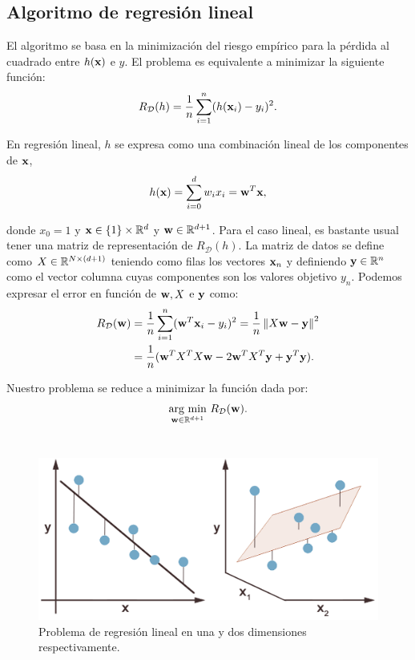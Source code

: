 \documentclass[oneside,openright,titlepage,numbers=noenddot,openany,headinclude,footinclude=true,
cleardoublepage=empty,abstractoff,BCOR=5mm,paper=a4,fontsize=12pt,main=spanish]{scrreprt}
\begin{document}
\subsection*{Algoritmo de regresión lineal}

El algoritmo se basa en la minimización del riesgo empírico para la pérdida al cuadrado entre $h(\textbf{x})$ e $y$. El problema es equivalente a minimizar la siguiente función:
\begin{equation*}
    R_{\mathcal{D}}(h) = \frac{1}{n} \sum_{i=1}^n (h(\textbf{x}_i)-y_i)^2.
\end{equation*}

En regresión lineal, $h$ se expresa como una combinación lineal de los componentes de $\textbf{x}$,
\begin{equation*}
    h(\textbf{x})=\sum_{i=0}^d w_i x_i = \textbf{w}^T \textbf{x},
\end{equation*}

donde $x_0=1$ y $\textbf{x} \in \{1\} \times \mathbb{R}^d$ y $\textbf{w} \in \mathbb{R}^{d+1}$. Para el caso lineal, es bastante usual tener una matriz de representación de $R_{\mathcal{D}}(h)$. La matriz de datos se define como $X\in \mathbb{R}^{N \times (d+1)}$ teniendo como filas los vectores $\textbf{x}_n$ y definiendo $\textbf{y}\in \mathbb{R}^n$ como el vector columna cuyas componentes son los valores objetivo $y_n$. Podemos expresar el error en función de $\textbf{w}, X$ e $\textbf{y}$ como:
\begin{equation}
\begin{split}
    R_{\mathcal{D}}(\textbf{w})&=\frac{1}{n}\sum_{i=1}^n (\textbf{w}^T\textbf{x}_i-y_i)^2=\frac{1}{n} \left\lVert X\textbf{w}-\textbf{y}\right\rVert^2\\
    &=\frac{1}{n} (\textbf{w}^TX^TX\textbf{w} -2\textbf{w}^TX^T\textbf{y}+\textbf{y}^T\textbf{y}).
\end{split}
\label{eq:derivable}
\end{equation}

Nuestro problema se reduce a minimizar la función dada por: 
\begin{equation}
    \underset{\nm{w}\in \R^{d+1}}{\text{arg min}} \ R_{\mathcal{D}}(\nm{w}).
    \label{eq:soloptima}
\end{equation}\ 

\begin{figure}[h]
	\centering
	\includegraphics[width=13.5cm]{linear_regresion.png}
	\caption{Problema de regresión lineal en una y dos dimensiones respectivamente.}
    \label{fig:reglin}
\end{figure}
\end{document}
